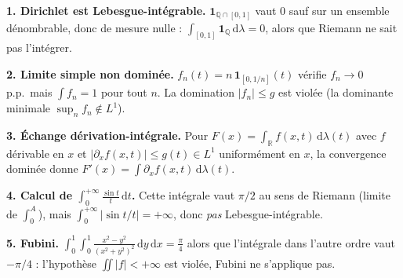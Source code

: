 \decsep{}



\begin{mdframed}[style=exbar]
  \textbf{1. Dirichlet est Lebesgue-intégrable.}\enspace%
  $\mathbf{1}_{\mathbb{Q}\cap[0,1]}$ vaut $0$ sauf sur un ensemble dénombrable,
  donc de mesure nulle :
  $\int_{[0,1]} \mathbf{1}_{\mathbb{Q}}\,\mathrm{d}\lambda = 0$,
  alors que Riemann ne sait pas l'intégrer.

  \smallskip\noindent
  \textbf{2. Limite simple non dominée.}\enspace%
  $f_n(t) = n\,\mathbf{1}_{[0,1/n]}(t)$ vérifie $f_n \to 0$ p.p.\ mais
  $\int f_n = 1$ pour tout $n$. La domination $|f_n| \leq g$ est violée
  (la dominante minimale $\sup_n f_n\notin L^1$).

  \smallskip\noindent
  \textbf{3. Échange dérivation-intégrale.}\enspace%
  Pour $F(x) = \int_\mathbb{R} f(x,t)\,\mathrm{d}\lambda(t)$ avec $f$ dérivable
  en $x$ et $|\partial_x f(x,t)| \leq g(t) \in L^1$ uniformément en $x$,
  la convergence dominée donne $F'(x) = \int \partial_x f(x,t)\,\mathrm{d}\lambda(t)$.

  \smallskip\noindent
  \textbf{4. Calcul de $\int_0^{+\infty}\frac{\sin t}{t}\,\mathrm{d}t$.}\enspace%
  Cette intégrale vaut $\pi/2$ au sens de Riemann (limite de $\int_0^A$),
  mais $\int_0^{+\infty}|\sin t/t| = +\infty$, donc \emph{pas}
  Lebesgue-intégrable.

  \smallskip\noindent
  \textbf{5. Fubini.}\enspace%
  $\displaystyle\int_0^1\!\!\int_0^1 \frac{x^2 - y^2}{{(x^2+y^2)}^2}\,\mathrm{d}y\,\mathrm{d}x
  = \frac{\pi}{4}$ alors que l'intégrale dans l'autre ordre vaut $-\pi/4$ :
  l'hypothèse $\iint |f| < +\infty$ est violée, Fubini ne s'applique pas.
\end{mdframed}

\vspace{6pt}

